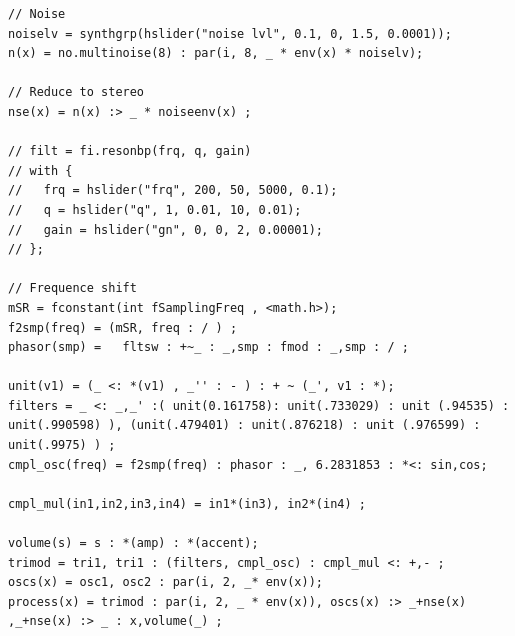 \documentclass{article}
\begin{document}
\begin{lstlisting}[caption=\texttt{generic_snarefs.dsp}]
// Noise
noiselv = synthgrp(hslider("noise lvl", 0.1, 0, 1.5, 0.0001));
n(x) = no.multinoise(8) : par(i, 8, _ * env(x) * noiselv);

// Reduce to stereo
nse(x) = n(x) :> _ * noiseenv(x) ;

// filt = fi.resonbp(frq, q, gain)
// with {
//   frq = hslider("frq", 200, 50, 5000, 0.1);
//   q = hslider("q", 1, 0.01, 10, 0.01);
//   gain = hslider("gn", 0, 0, 2, 0.00001);
// };

// Frequence shift
mSR = fconstant(int fSamplingFreq , <math.h>);
f2smp(freq) = (mSR, freq : / ) ;
phasor(smp) =   fltsw : +~_ : _,smp : fmod : _,smp : / ;
				       
unit(v1) = (_ <: *(v1) , _'' : - ) : + ~ (_', v1 : *);
filters = _ <: _,_' :( unit(0.161758): unit(.733029) : unit (.94535) : unit(.990598) ), (unit(.479401) : unit(.876218) : unit (.976599) : unit(.9975) ) ;
cmpl_osc(freq) = f2smp(freq) : phasor : _, 6.2831853 : *<: sin,cos; 

cmpl_mul(in1,in2,in3,in4) = in1*(in3), in2*(in4) ;

volume(s) = s : *(amp) : *(accent);
trimod = tri1, tri1 : (filters, cmpl_osc) : cmpl_mul <: +,- ;
oscs(x) = osc1, osc2 : par(i, 2, _* env(x));
process(x) = trimod : par(i, 2, _ * env(x)), oscs(x) :> _+nse(x) ,_+nse(x) :> _ : x,volume(_) ;
\end{lstlisting}
\end{document}
